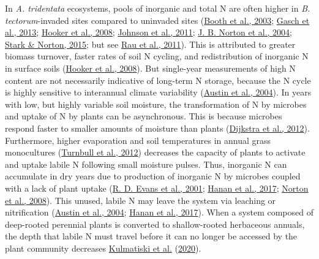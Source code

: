 \documentclass[
  11pt,
  a4paper,
]{article}
\begin{document}
In \emph{A. tridentata} ecosystems, pools of inorganic and total N are often higher in \emph{B. tectorum}-invaded sites compared to uninvaded sites (\protect\hyperlink{ref-Booth2003}{Booth et al., 2003}; \protect\hyperlink{ref-Gasch2013}{Gasch et al., 2013}; \protect\hyperlink{ref-Hooker2008biogeochem}{Hooker et al., 2008}; \protect\hyperlink{ref-Johnson2011}{Johnson et al., 2011}; \protect\hyperlink{ref-Norton2004}{J. B. Norton et al., 2004}; \protect\hyperlink{ref-Stark2015}{Stark \& Norton, 2015}; but see \protect\hyperlink{ref-Rau2011}{Rau et al., 2011}). This is attributed to greater biomass turnover, faster rates of soil N cycling, and redistribution of inorganic N in surface soils (\protect\hyperlink{ref-Hooker2008biogeochem}{Hooker et al., 2008}). But single-year measurements of high N content are not necessarily indicative of long-term N storage, because the N cycle is highly sensitive to interannual climate variability (\protect\hyperlink{ref-Austin2004}{Austin et al., 2004}). In years with low, but highly variable soil moisture, the transformation of N by microbes and uptake of N by plants can be asynchronous. This is because microbes respond faster to smaller amounts of moisture than plants (\protect\hyperlink{ref-Dijkstra2012}{Dijkstra et al., 2012}). Furthermore, higher evaporation and soil temperatures in annual grass monocultures (\protect\hyperlink{ref-Turnbull2012}{Turnbull et al., 2012}) decreases the capacity of plants to activate and uptake labile N following small moisture pulses. Thus, inorganic N can accumulate in dry years due to production of inorganic N by microbes coupled with a lack of plant uptake (\protect\hyperlink{ref-Evans2001}{R. D. Evans et al., 2001}; \protect\hyperlink{ref-Hanan2017}{Hanan et al., 2017}; \protect\hyperlink{ref-Norton2008}{Norton et al., 2008}). This unused, labile N may leave the system via leaching or nitrification (\protect\hyperlink{ref-Austin2004}{Austin et al., 2004}; \protect\hyperlink{ref-Hanan2017}{Hanan et al., 2017}). When a system composed of deep-rooted perennial plants is converted to shallow-rooted herbaceous annuals, the depth that labile N must travel before it can no longer be accessed by the plant community decreases \protect\hyperlink{ref-Kulmatiski2020}{Kulmatiski et al.} (\protect\hyperlink{ref-Kulmatiski2020}{2020}).
\end{document}
